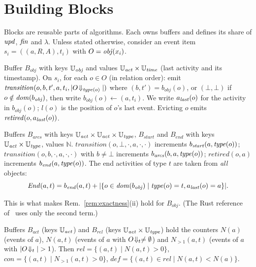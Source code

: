 \section{Building Blocks}\label{sec:blocks}

Blocks are reusable parts of algorithms. Each owns buffers and defines its
share of $\mathit{upd}$, $\mathit{fin}$ and $\lambda$. Unless stated otherwise, consider an
event item $s_i = ((a, R, A), t_i)$ with $O = \mathit{obj}(x_i)$.

\begin{definition}\label{def:tracker}
Buffer $B_{\mathit{obj}}$ with keys $\mathbb{U}_{\mathit{obj}}$ and values $\mathbb{U}_{\mathit{act}} \times \mathbb{U}_{\mathit{time}}$
(last activity and its timestamp). On $s_i$, for each $o \in O$ (in relation
order): emit $\mathit{transition}(o, b, t', a, t_i, |O\!\Downarrow_{\mathit{type}(o)}|)$ where
$(b, t') = b_{\mathit{obj}}(o)$, or $(\bot, \bot)$ if $o \notin \mathit{dom}(b_{\mathit{obj}})$,
then write $b_{\mathit{obj}}(o) \leftarrow (a, t_i)$. We write $a_{\mathit{last}}(o)$ for
the activity in $b_{\mathit{obj}}(o)$; $l(o)$ is the position of $o$'s last
event. Evicting $o$ emits $\mathit{retired}(o, a_{\mathit{last}}(o))$.
\end{definition}

\begin{definition}\label{def:df}
Buffers $B_{\mathit{arcs}}$ with keys $\mathbb{U}_{\mathit{act}} \times \mathbb{U}_{\mathit{act}} \times \mathbb{U}_{\mathit{type}}$,
$B_{\mathit{start}}$ and $B_{\mathit{end}}$ with keys $\mathbb{U}_{\mathit{act}} \times \mathbb{U}_{\mathit{type}}$,
values $\mathbb{N}$.
$\mathit{transition}(o, \bot, \cdot, a, \cdot, \cdot)$ increments $b_{\mathit{start}}(a, \mathit{type}(o))$;
$\mathit{transition}(o, b, \cdot, a, \cdot, \cdot)$ with $b \ne \bot$ increments
$b_{\mathit{arcs}}(b, a, \mathit{type}(o))$;
$\mathit{retired}(o, a)$ increments $b_{\mathit{end}}(a, \mathit{type}(o))$.
The end activities of type $t$ are taken from \emph{all} objects:
\[
  \mathit{End}(a, t) = b_{\mathit{end}}(a, t) + |\{o \in \mathit{dom}(b_{\mathit{obj}}) \mid \mathit{type}(o) = t, a_{\mathit{last}}(o) = a\}|.
\]
\end{definition}
This is what makes Rem.~\ref{rem:exactness}(ii) hold for $B_{\mathit{obj}}$.
(The Rust reference of~\cite{Muehlmeyer2026} uses only the second term.)

\begin{definition}\label{def:relations}
Buffers $B_{\mathit{act}}$ (keys $\mathbb{U}_{\mathit{act}}$) and $B_{\mathit{rel}}$ (keys
$\mathbb{U}_{\mathit{act}} \times \mathbb{U}_{\mathit{type}}$) hold the counters $N(a)$ (events of $a$), $N(a,t)$ (events of $a$ with
$O\!\Downarrow_{t} \ne \emptyset$) and $N_{>1}(a,t)$ (events of $a$ with
$|O\!\Downarrow_{t}| > 1$). Then
$\mathit{rel} = \{(a,t) \mid N(a,t) > 0\}$,
$\mathit{con} = \{(a,t) \mid N_{>1}(a,t) > 0\}$,
$\mathit{def} = \{(a,t) \in \mathit{rel} \mid N(a,t) < N(a)\}$.
\end{definition}

